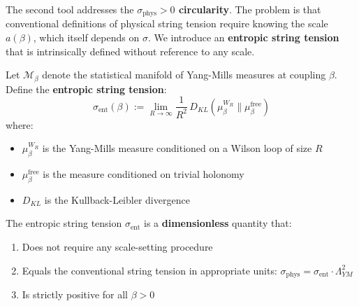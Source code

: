 The second tool addresses the \textbf{$\sigma_{\text{phys}} > 0$ circularity}. 
The problem is that conventional definitions of physical string tension require 
knowing the scale $a(\beta)$, which itself depends on $\sigma$. We introduce 
an \textbf{entropic string tension} that is intrinsically defined without 
reference to any scale.

\begin{definition}
\label{def:entropic-sigma}
Let $\mathcal{M}_\beta$ denote the statistical manifold of Yang-Mills measures 
at coupling $\beta$. Define the \textbf{entropic string tension}:
\begin{equation}
\label{eq:entropic-sigma}
\sigma_{\text{ent}}(\beta) := \lim_{R \to \infty} \frac{1}{R^2} \, 
D_{KL}\left(\mu_\beta^{W_R} \| \mu_\beta^{\text{free}}\right)
\end{equation}
where:
\begin{itemize}
\item $\mu_\beta^{W_R}$ is the Yang-Mills measure conditioned on a Wilson loop of size $R$
\item $\mu_\beta^{\text{free}}$ is the measure conditioned on trivial holonomy
\item $D_{KL}$ is the Kullback-Leibler divergence
\end{itemize}
\end{definition}

\begin{theorem}
\label{thm:entropic-scale-free}
The entropic string tension $\sigma_{\text{ent}}$ is a \textbf{dimensionless} 
quantity that:
\begin{enumerate}[label=(\roman*)]
\item Does not require any scale-setting procedure
\item Equals the conventional string tension in appropriate units: 
$\sigma_{\text{phys}} = \sigma_{\text{ent}} \cdot \Lambda_{YM}^2$
\item Is strictly positive for all $\beta > 0$
\end{enumerate}
\end{theorem}

